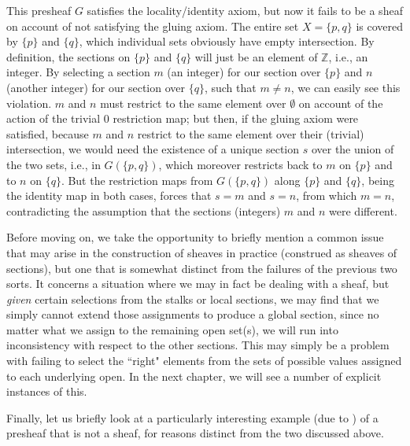\documentclass[a4paper]{book}
\theoremstyle{definition}
\theoremstyle{definition}
\theoremstyle{definition}
\theoremstyle{theorem}
\theoremstyle{definition}
\begin{document}
This presheaf $G$ satisfies the locality/identity axiom, but now it fails to be a sheaf on account of not satisfying the gluing axiom. The entire set $X = \{p,q\}$ is covered by $\{p\}$ and $\{q\}$, which individual sets obviously have empty intersection. By definition, the sections on $\{p\}$ and $\{q\}$ will just be an element of $\mathbb{Z}$, i.e., an integer. By selecting a section $m$ (an integer) for our section over $\{p\}$ and $n$ (another integer) for our section over $\{q\}$, such that $m \neq n$, we can easily see this violation. $m$ and $n$ must restrict to the same element over $\emptyset$ on account of the action of the trivial $0$ restriction map; but then, if the gluing axiom were satisfied, because $m$ and $n$ restrict to the same element over their (trivial) intersection, we would need the existence of a unique section $s$ over the union of the two sets, i.e., in $G(\{p,q\})$, which moreover restricts back to $m$ on $\{p\}$ and to $n$ on $\{q\}$. But the restriction maps from $G(\{p,q\})$ along $\{p\}$ and $\{q\}$, being the identity map in both cases, forces that $s = m$ and $s = n$, from which $m = n$, contradicting the assumption that the sections (integers) $m$ and $n$ were different. \par      
Before moving on, we take the opportunity to briefly mention a common issue that may arise in the construction of sheaves in practice (construed as sheaves of sections), but one that is somewhat distinct from the failures of the previous two sorts. It concerns a situation where we may in fact be dealing with a sheaf, but \textit{given} certain selections from the stalks or local sections, we may find that we simply cannot extend those assignments to produce a global section, since no matter what we assign to the remaining open set(s), we will run into inconsistency with respect to the other sections. This may simply be a problem with failing to select the ``right" elements from the sets of possible values assigned to each underlying open. In the next chapter, we will see a number of explicit instances of this.\par 
Finally, let us briefly look at a particularly interesting example (due to \cite{goguen_sheaf_1992}) of a presheaf that is not a sheaf, for reasons distinct from the two discussed above.  
\end{document}
